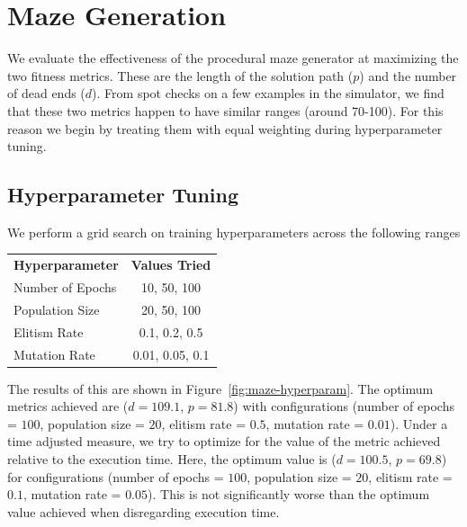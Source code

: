 \section{Maze Generation}
We evaluate the effectiveness of the procedural maze generator at maximizing the two fitness metrics. These are the length of the solution path ($p$) and the number of dead ends ($d$). From spot checks on a few examples in the simulator, we find that these two metrics happen to have similar ranges (around 70-100). For this reason we begin by treating them with equal weighting during hyperparameter tuning.

\subsection{Hyperparameter Tuning}

We perform a grid search on training hyperparameters across the following ranges
\begin{center}
    \begin{tabular}{ l c }
        \bf Hyperparameter & \bf Values Tried\\
        Number of Epochs & {10, 50, 100}\\
        Population Size & {20, 50, 100}\\
        Elitism Rate & {0.1, 0.2, 0.5}\\
        Mutation Rate & {0.01, 0.05, 0.1}
    \end{tabular}
\end{center}

The results of this are shown in Figure~\ref{fig:maze-hyperparam}. The optimum metrics achieved are ($d=109.1$, $p=81.8$) with configurations (number of epochs = $100$, population size = $20$, elitism rate = $0.5$, mutation rate = $0.01$). Under a time adjusted measure, we try to optimize for the value of the metric achieved relative to the execution time. Here, the optimum value is ($d=100.5$, $p=69.8$) for configurations (number of epochs = $100$, population size = $20$, elitism rate = $0.1$, mutation rate = $0.05$). This is not significantly worse than the optimum value achieved when disregarding execution time.

